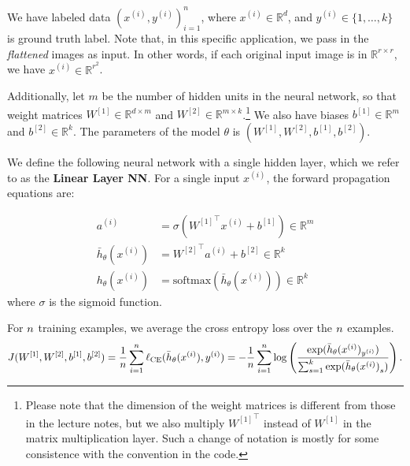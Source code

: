 

We have labeled data $(x^{(i)}, y^{(i)})_{i=1}^n$, where $x^{(i)} \in \mathbb{R}^d$, and $y^{(i)} \in \{1,\dots, k\}$ is ground truth label. Note that, in this specific application, we pass in the \textit{flattened} images as input. In other words, if each original input image is in $\mathbb{R}^{r \times r}$, we have $x^{(i)} \in \mathbb{R}^{r^2}$.

Additionally, let $m$ be the number of hidden units in the neural network, so that weight matrices $W^{[1]} \in \mathbb{R}^{d \times m}$ and $W^{[2]} \in \mathbb{R}^{m \times k}$.\footnote{Please note that the dimension of the weight matrices is different from those in the lecture notes, but we also multiply ${W^{[1]}}^\top$ instead of $W^{[1]}$ in the matrix multiplication layer.  Such a change of notation is mostly for some consistence with the convention in the code.} We also have biases $b^{[1]} \in \mathbb{R}^m$ and $b^{[2]} \in \mathbb{R}^k$. The parameters of the model $\theta$ is $(W^{[1]},W^{[2]},b^{[1]},b^{[2]})$.

We define the following neural network with a single hidden layer, which we refer to as the \textbf{Linear Layer NN}. For a single input $x^{(i)}$, the forward propagation equations are:

\begin{align}
  a^{(i)} &= \sigma \left( {W^{[1]}}^\top x^{(i)}  + b^{[1]} \right)  \in \mathbb{R}^m \nonumber \\
  \bar{h}_{\theta}(x^{(i)})&= {W^{[2]}}^\top a^{(i)} + b^{[2]} \in \mathbb{R}^k \nonumber \\
  {h}_{\theta}(x^{(i)}) &=  \mathrm{softmax}(\bar{h}_{\theta}(x^{(i)})) \in \mathbb{R}^k \nonumber
\end{align}
where $\sigma$ is the sigmoid function. 

For ${n}$ training examples, we average the cross entropy loss over the ${n}$ examples.
  \begin{equation*}
  J(W^{[1]},W^{[2]},b^{[1]},b^{[2]}) = \frac{1}{{n}}\sum_{i=1}^{n} \ell_\textup{CE}(\bar{h}_{\theta}(x^{(i)}),y^{(i)})  = - \frac{1}{{n}}\sum_{i=1}^{n} \log\left(\frac{\exp(\bar{h}_{\theta}(x^{(i)})_{y^{(i)}})}{\sum_{s=1}^{k}\exp({\bar{h}_{\theta}(x^{(i)})}_s)}\right).
  \end{equation*}

